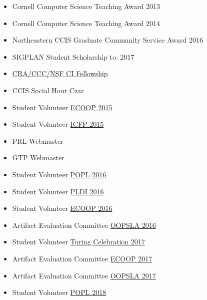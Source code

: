 \documentclass{article}
\begin{document}
\begin{itemize}
  \item {Cornell Computer Science Teaching Award} \hfill 2013
  \item {Cornell Computer Science Teaching Award} \hfill 2014
  \item {Northeastern CCIS Graduate Community Service Award} \hfill 2016
  \item {SIGPLAN Student Scholarship to: \turing{}} \hfill 2017
  \item \href{https://cifellows2020.org}{{CRA/CCC/NSF CI Fellowship}} \hfill {}
\end{itemize}


\begin{itemize}
  \item {CCIS Social Hour Czar} \hfill {}
  \item {Student Volunteer} \hfill \href{http://2015.ecoop.org/}{ECOOP 2015}
  \item {Student Volunteer} \hfill \href{http://icfpconference.org/icfp2015/}{ICFP 2015}
  \item {PRL Webmaster} \hfill \href{https://github.com/nuprl/website}{}
  \item {GTP Webmaster} \hfill \href{https://github.com/nuprl/gtp.github.io}{}
  \item {Student Volunteer} \hfill \href{http://conf.researchr.org/home/POPL-2016}{POPL 2016}
  \item {Student Volunteer} \hfill \href{http://conf.researchr.org/home/PLDI-2016}{PLDI 2016}
  \item {Student Volunteer} \hfill \href{http://2016.ecoop.org/}{ECOOP 2016}
  \item {Artifact Evaluation Committee} \hfill \href{http://2016.splashcon.org/track/splash-2016-artifacts}{OOPSLA 2016}
  \item {Student Volunteer} \hfill \href{https://www.acm.org/turing-award-50/conference}{Turing Celebration 2017}
  \item {Artifact Evaluation Committee} \hfill \href{https://2017.ecoop.org/track/ecoop-2017-Artifacts}{ECOOP 2017}
  \item {Artifact Evaluation Committee} \hfill \href{https://2017.splashcon.org/track/splash-2017-OOPSLA-Artifacts}{OOPSLA 2017}
  \item {Student Volunteer} \hfill \href{http://conf.researchr.org/home/POPL-2018}{POPL 2018}

\end{itemize}
\end{document}
